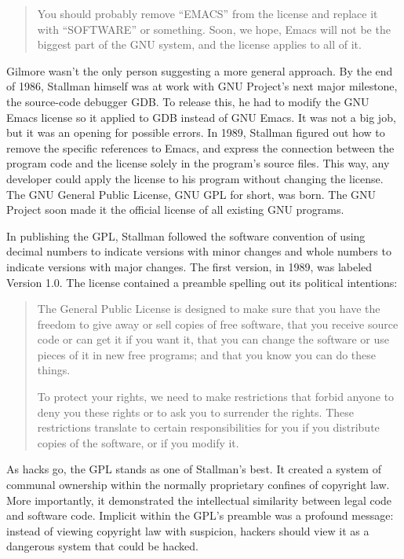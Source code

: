 \begin{quote}
You should probably remove ``EMACS'' from the license and replace it with ``SOFTWARE'' or something. Soon, we hope, Emacs will not be the biggest part of the GNU system, and the license applies to all of it.
\end{quote}

Gilmore wasn't the only person suggesting a more general approach. By the end of 1986, Stallman himself was at work with GNU Project's next major milestone, the source-code debugger GDB.  To release this, he had to modify the GNU Emacs license so it applied to GDB instead of GNU Emacs.  It was not a big job, but it was an opening for possible errors.  In 1989, Stallman figured out how to remove the specific references to Emacs, and express the connection between the program code and the license solely in the program's source files.  This way, any developer could apply the license to his program without changing the license. The GNU General Public License, GNU GPL for short, was born.  The GNU Project soon made it the official license of all existing GNU programs.

In publishing the GPL, Stallman followed the software convention of using decimal numbers to indicate versions with minor changes and whole numbers to indicate versions with major changes. The first version, in 1989, was labeled Version 1.0. The license contained a preamble spelling out its political intentions:

\begin{quote}
The General Public License is designed to make sure that you have the freedom to give away or sell copies of free software, that you receive source code or can get it if you want it, that you can change the software or use pieces of it in new free programs; and that you know you can do these things.

To protect your rights, we need to make restrictions that forbid anyone to deny you these rights or to ask you to surrender the rights. These restrictions translate to certain responsibilities for you if you distribute copies of the software, or if you modify it.
\end{quote}

As hacks go, the GPL stands as one of Stallman's best. It created a system of communal ownership within the normally proprietary confines of copyright law. More importantly, it demonstrated the intellectual similarity between legal code and software code. Implicit within the GPL's preamble was a profound message: instead of viewing copyright law with suspicion, hackers should view it as a dangerous system that could be hacked.

